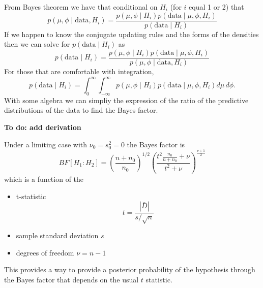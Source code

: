 \documentclass[11pt]{article}
\def\BF{\textit{BF}}
\def\n0{n_0}
\def\data{\text{data}}
\begin{document}
From Bayes theorem we have that conditional on $H_i$ (for $i$ equal 1 or 2) that
$$p(\mu, \phi  \mid \data, H_i) = \frac{p(\mu, \phi \mid H_i) p(\data \mid \mu, \phi, H_i)}{p(\data \mid H_i)}$$
If we happen to know the conjugate updating rules and the forms of the densities then we can solve for $p(\data \mid H_i)$ as
$$
p(\data \mid H_i) = \frac{p(\mu, \phi  \mid H_i) p(\data \mid \mu, \phi, H_i)}{p(\mu, \phi \mid \data, H_i)}
$$
For those that are comfortable with integration,
$$
p(\data \mid H_i) = \int_0^\infty \int_{-\infty}^\infty p(\mu, \phi  \mid H_i) p(\data \mid \mu, \phi, H_i) d \mu \, d \phi.
$$
With some algebra we can simpliy the expression of the ratio of the predictive distributions of the data to find the Bayes factor. 

{\bf To do: add derivation}

Under a limiting case with $\nu_0 =s^2_0 = 0$ the Bayes factor is   
    $$
   \BF[H_1 : H_2] = \left(\frac{n + \n0}{\n0} \right)^{1/2} \left(
  \frac{ t^2  \frac{\n0}{n + \n0} + \nu }
  { t^2  + \nu} \right)^{\frac{\nu + 1}{2}}
    $$
which is a function of the 
\begin{itemize}
\item t-statistic $$t = \frac{|\bar{D}|}{s/\sqrt{n}}$$   
\item sample standard deviation $s$ 
\item degrees of freedom $\nu = n -1$
\end{itemize}

This provides a way to provide a posterior probability of the hypothesis through the Bayes factor that depends on the usual $t$ statistic. 
\end{document}

